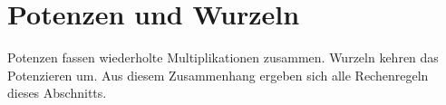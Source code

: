 \section{Potenzen und Wurzeln}
\label{sec:fundamentals_powers_and_roots}

Potenzen fassen wiederholte Multiplikationen zusammen. Wurzeln kehren das
Potenzieren um. Aus diesem Zusammenhang ergeben sich alle Rechenregeln dieses
Abschnitts.




